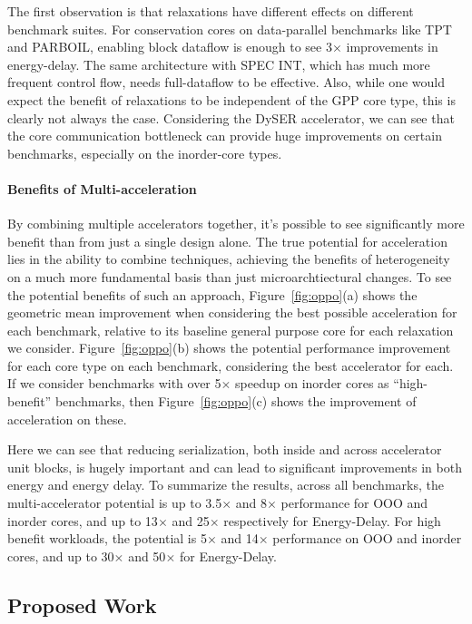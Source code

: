The first observation is that
relaxations have different effects on different benchmark suites.  For conservation
cores on data-parallel benchmarks like TPT and PARBOIL, enabling block dataflow
is enough to see 3$\times$ improvements in energy-delay.  The same architecture
with SPEC INT, which has much more frequent control flow, needs full-dataflow to be
effective.  Also, while one would expect the benefit of relaxations to be independent
of the GPP core type, this is clearly not always the case.  Considering the DySER
accelerator, we can see that the core communication bottleneck can provide huge
improvements on certain benchmarks, especially on the inorder-core types.

\paragraph{Benefits of Multi-acceleration}
By combining multiple accelerators together, it's possible to see significantly
more benefit than from just a single design alone.  The true potential
for acceleration lies in the ability to combine techniques, achieving the benefits of 
heterogeneity on a much more fundamental basis than just microarchtiectural changes.
To see the potential benefits of such an approach, Figure~\ref{fig:oppo}(a) 
shows the geometric mean improvement when considering the best possible 
acceleration for each benchmark, relative to its baseline general purpose
core for each relaxation
we consider. Figure~\ref{fig:oppo}(b) shows the potential performance 
improvement for each core type on each benchmark, considering the best accelerator for each.  If we consider benchmarks with over 5$\times$ speedup on inorder cores as 
``high-benefit'' benchmarks, then Figure~\ref{fig:oppo}(c) shows the improvement
of acceleration on these.  

Here we can see that reducing serialization, both inside and across accelerator
unit blocks, is hugely important and can lead to significant improvements in
both energy and energy delay.  To summarize the results, across all benchmarks,
the multi-accelerator potential is up to 3.5$\times$ and 8$\times$ performance
for OOO and inorder cores, and up to 13$\times$ and 25$\times$ respectively for
Energy-Delay.  For high benefit workloads, the potential is 5$\times$ and
14$\times$ performance on OOO and inorder cores, and up to 30$\times$ and
50$\times$ for Energy-Delay.

\subsection{Proposed Work} 

